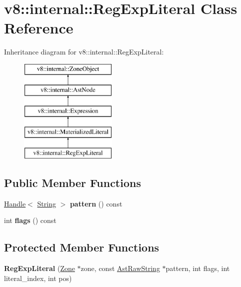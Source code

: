 \hypertarget{classv8_1_1internal_1_1_reg_exp_literal}{}\section{v8\+:\+:internal\+:\+:Reg\+Exp\+Literal Class Reference}
\label{classv8_1_1internal_1_1_reg_exp_literal}
Inheritance diagram for v8\+:\+:internal\+:\+:Reg\+Exp\+Literal\+:\begin{figure}[H]
\begin{center}
\leavevmode
\includegraphics[height=5.000000cm]{classv8_1_1internal_1_1_reg_exp_literal}
\end{center}
\end{figure}
\subsection*{Public Member Functions}
\begin{DoxyCompactItemize}
\item 
\hyperlink{classv8_1_1internal_1_1_handle}{Handle}$<$ \hyperlink{classv8_1_1internal_1_1_string}{String} $>$ {\bfseries pattern} () const \hypertarget{classv8_1_1internal_1_1_reg_exp_literal_a91a6b8fa99eda08cc060c8319ab08a41}{}\label{classv8_1_1internal_1_1_reg_exp_literal_a91a6b8fa99eda08cc060c8319ab08a41}

\item 
int {\bfseries flags} () const \hypertarget{classv8_1_1internal_1_1_reg_exp_literal_a37c9bbbc4a0ca13d222d8faf3c49985c}{}\label{classv8_1_1internal_1_1_reg_exp_literal_a37c9bbbc4a0ca13d222d8faf3c49985c}

\end{DoxyCompactItemize}
\subsection*{Protected Member Functions}
\begin{DoxyCompactItemize}
\item 
{\bfseries Reg\+Exp\+Literal} (\hyperlink{classv8_1_1internal_1_1_zone}{Zone} $\ast$zone, const \hyperlink{classv8_1_1internal_1_1_ast_raw_string}{Ast\+Raw\+String} $\ast$pattern, int flags, int literal\+\_\+index, int pos)\hypertarget{classv8_1_1internal_1_1_reg_exp_literal_a19cb2b6dd052519841b5a5875ac6bca0}{}\label{classv8_1_1internal_1_1_reg_exp_literal_a19cb2b6dd052519841b5a5875ac6bca0}

\end{DoxyCompactItemize}

